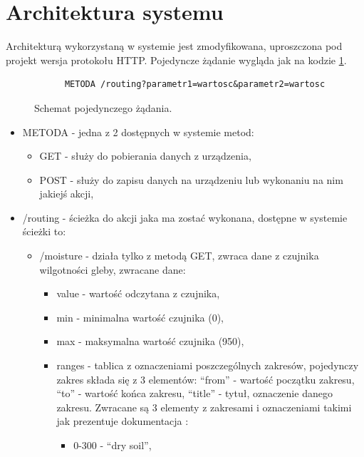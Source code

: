 \documentclass[a4paper,twoside,12pt]{book}
\begin{document}
\section{Architektura systemu}

Architekturą wykorzystaną w systemie jest zmodyfikowana, uproszczona pod projekt wersja protokołu HTTP. Pojedyncze żądanie wygląda jak na kodzie \ref{code:1}.

\begin{figure}[H]
   \centering
   \footnotesize
   \begin{lstlisting}
      METODA /routing?parametr1=wartosc&parametr2=wartosc
   \end{lstlisting}
   \caption{Schemat pojedynczego żądania.}
   \label{code:1}
\end{figure}

\begin{itemize}
   \item METODA - jedna z 2 dostępnych w systemie metod:
         \begin{itemize}
            \item GET - służy do pobierania danych z urządzenia,
            \item POST - służy do zapisu danych na urządzeniu lub wykonaniu na nim jakiejś akcji,
         \end{itemize}
   \item	/routing - ścieżka do akcji jaka ma zostać wykonana, dostępne w systemie ścieżki to:
         \begin{itemize}
            \item /moisture - działa tylko z metodą GET, zwraca dane z czujnika wilgotności gleby, zwracane dane:
                  \begin{itemize}
                     \item value - wartość odczytana z czujnika,
                     \item min - minimalna wartość czujnika (0),
                     \item max - maksymalna wartość czujnika (950),
                     \item ranges - tablica z oznaczeniami poszczególnych zakresów, pojedynczy zakres składa się z 3 elementów: ``from'' - wartość początku zakresu, ``to'' - wartość końca zakresu, ``title'' - tytuł, oznaczenie danego zakresu. Zwracane są 3 elementy z zakresami i oznaczeniami takimi jak prezentuje dokumentacja \cite{bib:url006}:
                           \begin{itemize}
                              \item 0-300 - ``dry soil'',

\end{itemize}
\end{itemize}
\end{itemize}
\end{itemize}
\end{document}
